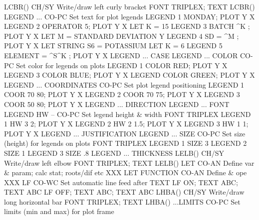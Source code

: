 LCBR()                      CH/SY Write/draw left curly bracket
                                  FONT TRIPLEX; TEXT LCBR()
LEGEND ...                  CO-PC Set text for plot legends
                                  LEGEND 1 MONDAY; PLOT Y X
                                  LEGEND 2 OPERATOR 5; PLOT Y X
                                  LET K = 15
                                  LEGEND 3 BATCH ^K ; PLOT Y X
                                  LET M = STANDARD DEVIATION Y
                                  LEGEND 4 SD = ^M ; PLOT Y X
                                  LET STRING S6 = POTASSIUM
                                  LET K = 6
                                  LEGEND 5 ELEMENT = ^S^K ; PLOT Y X
LEGEND ... CASE
LEGEND ... COLOR            CO-PC Set color for legends on plots
                                  LEGEND 1 COLOR RED; PLOT Y X
                                  LEGEND 3 COLOR BLUE; PLOT Y X
                                  LEGEND COLOR GREEN; PLOT Y X
LEGEND ... COORDINATES      CO-PC Set plot legend positioning
                                  LEGEND 1 COOR 70 80; PLOT Y X
                                  LEGEND 2 COOR 70 75; PLOT Y X
                                  LEGEND 3 COOR 50 80; PLOT Y X
LEGEND ... DIRECTION
LEGEND ... FONT
LEGEND HW  --               CO-PC Set legend height & width
                                  FONT TRIPLEX
                                  LEGEND 1 HW 3 2; PLOT Y X
                                  LEGEND 2 HW 2 1.5; PLOT Y X
                                  LEGEND 3 HW 1 1; PLOT Y X
LEGEND ... JUSTIFICATION
LEGEND ... SIZE             CO-PC Set size (height) for legends on plots
                                  FONT TRIPLEX
                                  LEGEND 1 SIZE 3
                                  LEGEND 2 SIZE 1
                                  LEGEND 3 SIZE .8
LEGEND ... THICKNESS
LELB()                      CH/SY Write/draw left elbow
                                  FONT TRIPLEX; TEXT LELB()
LET                         CO-AN Define var & param; calc stat; roots/dif etc
                                  XXX
                                  LET FUNCTION                CO-AN Define & ope
                                  XXX
LF                          CO-WC Set automatic line feed after TEXT
                                  LF ON; TEXT ABC; TEXT ABC
                                  LF OFF; TEXT ABC; TEXT ABC
LHBA()                      CH/SY Write/draw long horizontal bar
                                  FONT TRIPLEX; TEXT LHBA()
...LIMITS                   CO-PC Set limits (min and max) for plot frame
